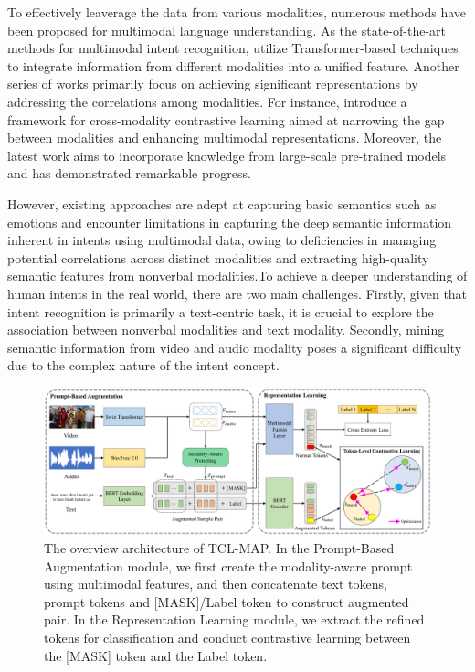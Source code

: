 \documentclass[letterpaper]{article}
\begin{document}
To effectively leaverage the data from various modalities, numerous methods have been proposed for multimodal language understanding. As the state-of-the-art methods for multimodal intent recognition, \cite{tsai2019multimodal, 10.1145/3394171.3413678, rahman2020integrating} utilize Transformer-based techniques to integrate information from different modalities into a unified feature. Another series of works primarily focus on achieving significant representations by addressing the correlations among modalities. For instance, \cite{dong2022improving} introduce a framework for cross-modality contrastive learning aimed at narrowing the gap between modalities and enhancing multimodal representations. Moreover, the latest work \cite{yu-etal-2023-speech} aims to incorporate knowledge from large-scale pre-trained models and has demonstrated remarkable progress.

However, existing approaches are adept at capturing basic semantics such as emotions and encounter limitations in capturing the deep semantic information inherent in intents using multimodal data, owing to deficiencies in managing potential correlations across distinct modalities and extracting high-quality semantic features from nonverbal modalities.To achieve a deeper understanding of human intents in the real world, there are two main challenges. Firstly, given that intent recognition is primarily a text-centric task, it is crucial to explore the association between nonverbal modalities and text modality. Secondly, mining semantic information from video and audio modality poses a significant difficulty due to the complex nature of the intent concept.

\begin{figure}[h!]
\centering
\includegraphics[scale=.21]{Figs/TCL_MAP.pdf}
\caption{ \protect \label{TCL_MAP} The overview architecture of TCL-MAP. In the Prompt-Based Augmentation module, we first create the modality-aware prompt using multimodal features, and then concatenate text tokens, prompt tokens and [MASK]/Label token to construct augmented pair. In the Representation Learning module, we extract the refined tokens for classification and conduct  contrastive learning between the [MASK] token and the Label token.
}
\end{figure}
\end{document}
